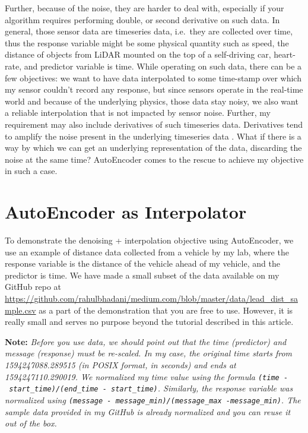 \documentclass[onecolumn]{article}
\begin{document}
Further, because of the noise, they are harder to deal with, especially
if your algorithm requires performing double, or second derivative on
such data. In general, those sensor data are timeseries data, i.e.~they
are collected over time, thus the response variable might be some
physical quantity such as speed, the distance of objects from LiDAR
mounted on the top of a self-driving car, heart-rate, and predictor
variable is time. While operating on such data, there can be a few
objectives: we want to have data interpolated to some time-stamp over
which my sensor couldn't record any response, but since sensors operate
in the real-time world and because of the underlying physics, those data
stay noisy, we also want a reliable interpolation that is not impacted
by sensor noise. Further, my requirement may also include derivatives of
such timeseries data. Derivatives tend to amplify the noise present in
the underlying timeseries data \citep{bhadani2019real}. What if there is
a way by which we can get an underlying representation of the data,
discarding the noise at the same time? AutoEncoder comes to the rescue
to achieve my objective in such a case.

\section{AutoEncoder as Interpolator}\label{autoencoder-as-interpolator}

To demonstrate the denoising + interpolation objective using
AutoEncoder, we use an example of distance data collected from a vehicle
by my lab, where the response variable is the distance of the vehicle
ahead of my vehicle, and the predictor is time. We have made a small
subset of the data available on my GitHub repo at
\url{https://github.com/rahulbhadani/medium.com/blob/master/data/lead_dist_sample.csv}
as a part of the demonstration that you are free to use. However, it is
really small and serves no purpose beyond the tutorial described in this
article.

\textbf{Note:} \emph{Before you use data, we should point out that the
time (predictor) and message (response) must be re-scaled. In my case,
the original time starts from 1594247088.289515 (in POSIX format, in
seconds) and ends at 1594247110.290019. We normalized my time value
using the formula
\texttt{(time\ -\ start\_time)/(end\_time\ -\ start\_time)}. Similarly,
the response variable was normalized using
\texttt{(message\ -\ message\_min)/(message\_max\ -message\_min)}. The
sample data provided in my GitHub is already normalized and you can
reuse it out of the box.}
\end{document}
